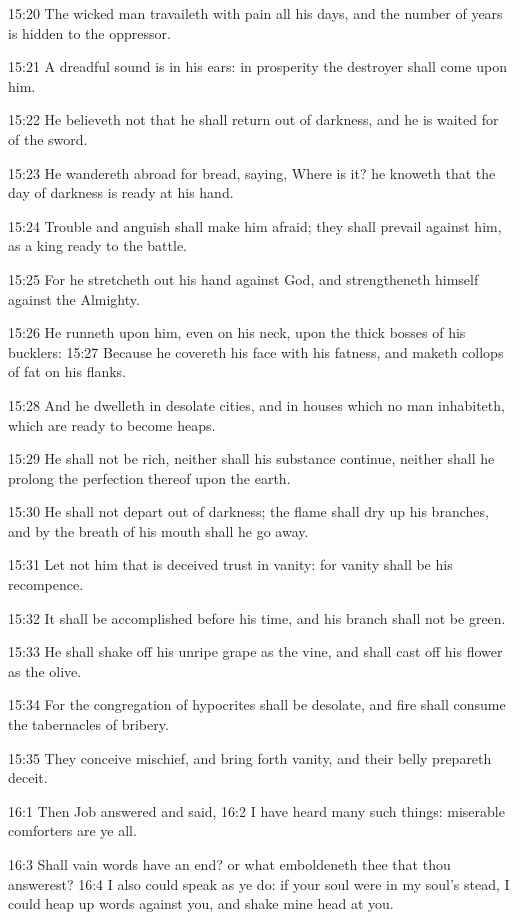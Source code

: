 15:20 The wicked man travaileth with pain all his days, and the number
of years is hidden to the oppressor.

15:21 A dreadful sound is in his ears: in prosperity the destroyer
shall come upon him.

15:22 He believeth not that he shall return out of darkness, and he is
waited for of the sword.

15:23 He wandereth abroad for bread, saying, Where is it? he knoweth
that the day of darkness is ready at his hand.

15:24 Trouble and anguish shall make him afraid; they shall prevail
against him, as a king ready to the battle.

15:25 For he stretcheth out his hand against God, and strengtheneth
himself against the Almighty.

15:26 He runneth upon him, even on his neck, upon the thick bosses of
his bucklers: 15:27 Because he covereth his face with his fatness, and
maketh collops of fat on his flanks.

15:28 And he dwelleth in desolate cities, and in houses which no man
inhabiteth, which are ready to become heaps.

15:29 He shall not be rich, neither shall his substance continue,
neither shall he prolong the perfection thereof upon the earth.

15:30 He shall not depart out of darkness; the flame shall dry up his
branches, and by the breath of his mouth shall he go away.

15:31 Let not him that is deceived trust in vanity: for vanity shall
be his recompence.

15:32 It shall be accomplished before his time, and his branch shall
not be green.

15:33 He shall shake off his unripe grape as the vine, and shall cast
off his flower as the olive.

15:34 For the congregation of hypocrites shall be desolate, and fire
shall consume the tabernacles of bribery.

15:35 They conceive mischief, and bring forth vanity, and their belly
prepareth deceit.

16:1 Then Job answered and said, 16:2 I have heard many such things:
miserable comforters are ye all.

16:3 Shall vain words have an end? or what emboldeneth thee that thou
answerest?  16:4 I also could speak as ye do: if your soul were in my
soul's stead, I could heap up words against you, and shake mine head
at you.


